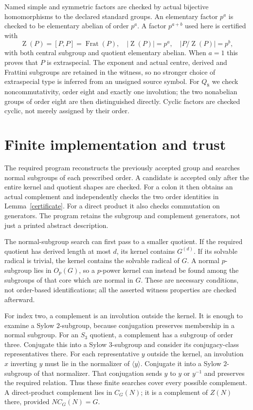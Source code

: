 \documentclass[11pt,a4paper]{article}
\newcommand{\Fr}{\operatorname{Frat}}
\newcommand{\Z}{\operatorname{Z}}
\begin{document}
Named simple and symmetric factors are checked by actual bijective
homomorphisms to the declared standard groups. An elementary factor
$p^a$ is checked to be elementary abelian of order $p^a$. A factor $p^{a+b}$
used here is certified with
\[
 \Z(P)=[P,P]=\Fr(P),\quad |\Z(P)|=p^a,\quad |P/\Z(P)|=p^b,
\]
with both central subgroup and quotient elementary abelian. When $a=1$
this proves that $P$ is extraspecial. The exponent and actual centre,
derived and Frattini subgroups are retained in the witness, so no stronger
choice of extraspecial type is inferred from an unsigned source symbol.
For $Q_8$ we check noncommutativity, order eight and exactly one involution;
the two nonabelian groups of order eight are then distinguished directly.
Cyclic factors are checked cyclic, not merely assigned by their order.

\section{Finite implementation and trust}
The required program reconstructs the previously accepted group and
searches normal subgroups of each prescribed order. A candidate is accepted
only after the entire kernel and quotient shapes are checked. For a colon
it then obtains an actual complement and independently checks the two
order identities in Lemma~\ref{certificate}. For a direct product it also
checks commutation on generators. The program retains the subgroup and
complement generators, not just a printed abstract description.

The normal-subgroup search can first pass to a smaller quotient. If the
required quotient has derived length at most $d$, its kernel contains
$G^{(d)}$. If its solvable radical is trivial, the kernel contains the
solvable radical of $G$. A normal $p$-subgroup lies in $O_p(G)$, so a
$p$-power kernel can instead be found among the subgroups of that core
which are normal in $G$. These are necessary conditions, not order-based
identifications; all the asserted witness properties are checked afterward.

For index two, a complement is an involution outside the kernel. It is
enough to examine a Sylow $2$-subgroup, because conjugation preserves
membership in a normal subgroup. For an $S_3$ quotient, a complement has
a subgroup of order three. Conjugate this into a Sylow $3$-subgroup and
consider its conjugacy-class representatives there. For each representative
$y$ outside the kernel, an involution $x$ inverting $y$ must lie in the
normalizer of $\langle y\rangle$. Conjugate it into a Sylow $2$-subgroup
of that normalizer. That conjugation sends $y$ to $y$ or $y^{-1}$ and
preserves the required relation. Thus these finite searches cover every
possible complement. A direct-product complement lies in $C_G(N)$; it
is a complement of $Z(N)$ there, provided $N C_G(N)=G$.
\end{document}
